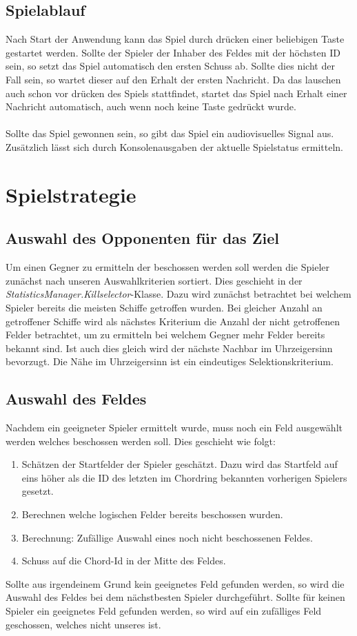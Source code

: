 \documentclass[a4paper]{article}
\begin{document}
\subsection{Spielablauf}
Nach Start der Anwendung kann das Spiel durch drücken einer beliebigen Taste gestartet werden. Sollte der Spieler der Inhaber des Feldes mit der höchsten ID sein, so setzt das Spiel automatisch den ersten Schuss ab. Sollte dies nicht der Fall sein, so wartet dieser auf den Erhalt der ersten Nachricht. Da das lauschen auch schon vor drücken des Spiels stattfindet, startet das Spiel nach Erhalt einer Nachricht automatisch, auch wenn noch keine Taste gedrückt wurde.\\\\
Sollte das Spiel gewonnen sein, so gibt das Spiel ein audiovisuelles Signal aus. Zusätzlich lässt sich durch Konsolenausgaben der aktuelle Spielstatus ermitteln.

\section{Spielstrategie}
\subsection{Auswahl des Opponenten für das Ziel}
Um einen Gegner zu ermitteln der beschossen werden soll werden die Spieler zunächst nach unseren Auswahlkriterien sortiert. Dies geschieht in der \textit{StatisticsManager.Killselector}-Klasse. Dazu wird zunächst betrachtet bei welchem Spieler bereits die meisten Schiffe getroffen wurden. Bei gleicher Anzahl an getroffener Schiffe wird als nächstes Kriterium die Anzahl der nicht getroffenen Felder betrachtet, um zu ermitteln bei welchem Gegner mehr Felder bereits bekannt sind. Ist auch dies gleich wird der nächste Nachbar im Uhrzeigersinn bevorzugt. Die Nähe im Uhrzeigersinn ist ein eindeutiges Selektionskriterium.

\subsection{Auswahl des Feldes}
Nachdem ein geeigneter Spieler ermittelt wurde, muss noch ein Feld ausgewählt werden welches beschossen werden soll. Dies geschieht wie folgt:
\begin{enumerate}
	\item Schätzen der Startfelder der Spieler geschätzt. Dazu wird das Startfeld auf eins höher als die ID des letzten im Chordring bekannten vorherigen Spielers gesetzt.
	\item Berechnen welche logischen Felder bereits beschossen wurden.
	\item Berechnung: Zufällige Auswahl eines noch nicht beschossenen Feldes.
	\item Schuss auf die Chord-Id in der Mitte des Feldes.
\end{enumerate}
Sollte aus irgendeinem Grund kein geeignetes Feld gefunden werden, so wird die Auswahl des Feldes bei dem nächstbesten Spieler durchgeführt. Sollte für keinen Spieler ein geeignetes Feld gefunden werden, so wird auf ein zufälliges Feld geschossen, welches nicht unseres ist.
\end{document}
